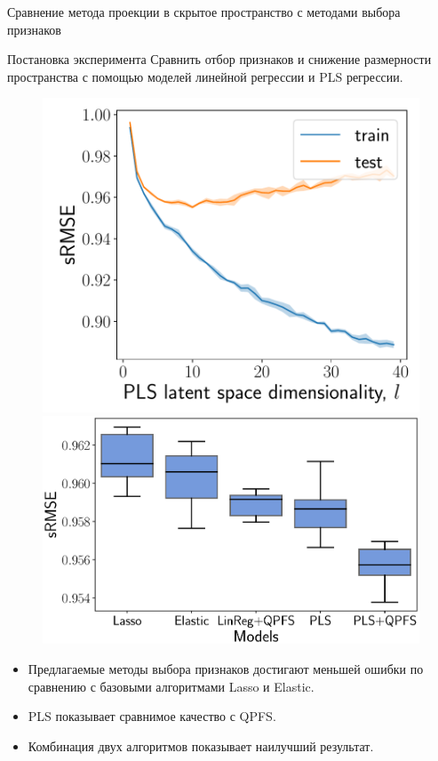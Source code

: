 \documentclass[9pt]{beamer}
\begin{document}
\begin{frame}{Сравнение метода проекции в скрытое пространство с методами выбора признаков}

\begin{block}{Постановка эксперимента}
	 	Сравнить отбор признаков и снижение размерности пространства с помощью моделей линейной регрессии и PLS регрессии.
\end{block}

\begin{figure}[h]
	\begin{minipage}{.43\linewidth}
		\centering
		\includegraphics[width=1.\linewidth]{figs/pls_vs_k}
	\end{minipage}%
	\begin{minipage}{.57\linewidth}
		\centering
		\includegraphics[width=1.\linewidth]{figs/models2}
	\end{minipage}
\end{figure}
\begin{itemize}
	\item Предлагаемые методы выбора признаков достигают меньшей ошибки по сравнению с базовыми алгоритмами Lasso и Elastic.
	\item PLS показывает сравнимое качество с QPFS.
	\item Комбинация двух алгоритмов показывает наилучший результат.
\end{itemize}

\end{frame}
\end{document}
